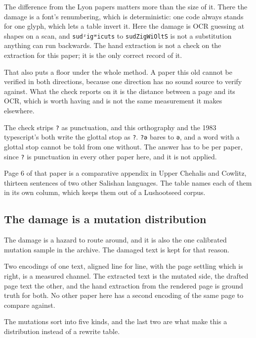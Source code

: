 The difference from the Lyon papers matters more than the size of it. There the damage is a font's renumbering, which is deterministic: one code always stands for one glyph, which lets a table invert it. Here the damage is OCR guessing at shapes on a scan, and \texttt{sudᶻigʷicuts} to \texttt{sudZigWiOltS} is not a substitution anything can run backwards. The hand extraction is not a check on the extraction for this paper; it is the only correct record of it.

That also puts a floor under the whole method. A paper this old cannot be verified in both directions, because one direction has no sound source to verify against. What the check reports on it is the distance between a page and its OCR, which is worth having and is not the same measurement it makes elsewhere.

The check strips \texttt{?} as punctuation, and this orthography and the 1983 typescript's both write the glottal stop as \texttt{?}. \texttt{?ə} bares to \texttt{ə}, and a word with a glottal stop cannot be told from one without. The answer has to be per paper, since \texttt{?} is punctuation in every other paper here, and it is not applied.

Page 6 of that paper is a comparative appendix in Upper Chehalis and Cowlitz, thirteen sentences of two other Salishan languages. The table names each of them in its own column, which keeps them out of a Lushootseed corpus.

\subsection{The damage is a mutation distribution}

The damage is a hazard to route around, and it is also the one calibrated mutation sample in the archive. The damaged text is kept for that reason.

Two encodings of one text, aligned line for line, with the page settling which is right, is a measured channel. The extracted text is the mutated side, the drafted page text the other, and the hand extraction from the rendered page is ground truth for both. No other paper here has a second encoding of the same page to compare against.

The mutations sort into five kinds, and the last two are what make this a distribution instead of a rewrite table.


